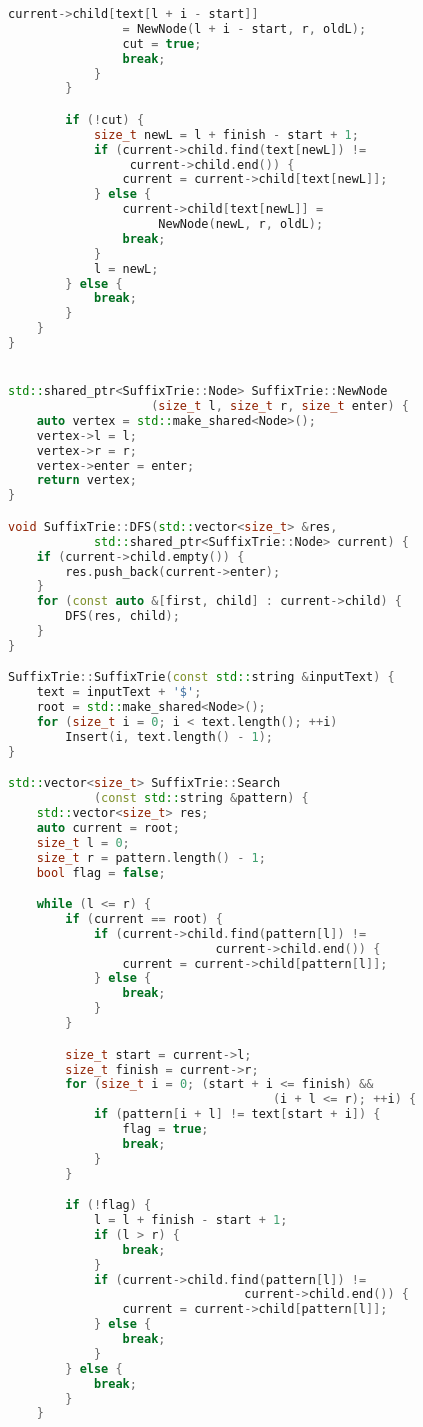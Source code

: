 \documentclass[12pt]{article}
\begin{document}
\begin{itemize}
\begin{lstlisting}[language=C++]
                current->child[text[l + i - start]] 
                = NewNode(l + i - start, r, oldL);
                cut = true;
                break;
            }
        }

        if (!cut) {
            size_t newL = l + finish - start + 1;
            if (current->child.find(text[newL]) !=
                 current->child.end()) {
                current = current->child[text[newL]];
            } else {
                current->child[text[newL]] =
                     NewNode(newL, r, oldL);
                break;
            }
            l = newL;
        } else {
            break;
        }
    }
}


std::shared_ptr<SuffixTrie::Node> SuffixTrie::NewNode
                    (size_t l, size_t r, size_t enter) {
    auto vertex = std::make_shared<Node>();
    vertex->l = l;
    vertex->r = r;
    vertex->enter = enter;
    return vertex;
}

void SuffixTrie::DFS(std::vector<size_t> &res, 
            std::shared_ptr<SuffixTrie::Node> current) {
    if (current->child.empty()) {
        res.push_back(current->enter);
    }
    for (const auto &[first, child] : current->child) {
        DFS(res, child);
    }
}

SuffixTrie::SuffixTrie(const std::string &inputText) {
    text = inputText + '$';
    root = std::make_shared<Node>();
    for (size_t i = 0; i < text.length(); ++i)
        Insert(i, text.length() - 1);
}

std::vector<size_t> SuffixTrie::Search
            (const std::string &pattern) {
    std::vector<size_t> res;
    auto current = root;
    size_t l = 0;
    size_t r = pattern.length() - 1;
    bool flag = false;

    while (l <= r) {
        if (current == root) {
            if (current->child.find(pattern[l]) !=
                             current->child.end()) {
                current = current->child[pattern[l]];
            } else {
                break;
            }
        }

        size_t start = current->l;
        size_t finish = current->r;
        for (size_t i = 0; (start + i <= finish) &&
                                     (i + l <= r); ++i) {
            if (pattern[i + l] != text[start + i]) {
                flag = true;
                break;
            }
        }

        if (!flag) {
            l = l + finish - start + 1;
            if (l > r) {
                break;
            }
            if (current->child.find(pattern[l]) !=
                                 current->child.end()) {
                current = current->child[pattern[l]];
            } else {
                break;
            }
        } else {
            break;
        }
    }


\end{lstlisting}
\end{itemize}
\end{document}
